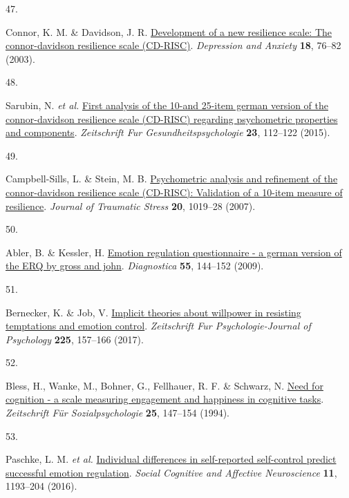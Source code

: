 \documentclass[
  man,floatsintext]{apa6}
\newlength{\cslhangindent}
\newlength{\csllabelwidth}
\newlength{\cslentryspacingunit} %
\newenvironment{CSLReferences}[2] %
 {%
  \setlength{\parindent}{0pt}
  \ifodd #1
  \let\oldpar\par
  \def\par{\hangindent=\cslhangindent\oldpar}
  \fi
  \setlength{\parskip}{#2\cslentryspacingunit}
 }%
 {}
\newcommand{\CSLLeftMargin}[1]{\parbox[t]{\csllabelwidth}{#1}}
\newcommand{\CSLRightInline}[1]{\parbox[t]{\linewidth - \csllabelwidth}{#1}\break}
\begin{document}
\begin{CSLReferences}{0}{0}
\leavevmode{}%
\CSLLeftMargin{47. }%
\CSLRightInline{Connor, K. M. \& Davidson, J. R. \href{https://doi.org/10.1002/da.10113}{Development of a new resilience scale: The connor-davidson resilience scale (CD-RISC)}. \emph{Depression and Anxiety} \textbf{18}, 76--82 (2003).}

\leavevmode{}%
\CSLLeftMargin{48. }%
\CSLRightInline{Sarubin, N. \emph{et al.} \href{https://doi.org/10.1026/0943-8149/a000142}{First analysis of the 10-and 25-item german version of the connor-davidson resilience scale (CD-RISC) regarding psychometric properties and components}. \emph{Zeitschrift Fur Gesundheitspsychologie} \textbf{23}, 112--122 (2015).}

\leavevmode{}%
\CSLLeftMargin{49. }%
\CSLRightInline{Campbell-Sills, L. \& Stein, M. B. \href{https://doi.org/10.1002/jts.20271}{Psychometric analysis and refinement of the connor-davidson resilience scale (CD-RISC): Validation of a 10-item measure of resilience}. \emph{Journal of Traumatic Stress} \textbf{20}, 1019--28 (2007).}

\leavevmode{}%
\CSLLeftMargin{50. }%
\CSLRightInline{Abler, B. \& Kessler, H. \href{https://doi.org/10.1026/0012-1924.55.3.144}{Emotion regulation questionnaire - a german version of the ERQ by gross and john}. \emph{Diagnostica} \textbf{55}, 144--152 (2009).}

\leavevmode{}%
\CSLLeftMargin{51. }%
\CSLRightInline{Bernecker, K. \& Job, V. \href{https://doi.org/10.1027/2151-2604/a000292}{Implicit theories about willpower in resisting temptations and emotion control}. \emph{Zeitschrift Fur Psychologie-Journal of Psychology} \textbf{225}, 157--166 (2017).}

\leavevmode{}%
\CSLLeftMargin{52. }%
\CSLRightInline{Bless, H., Wanke, M., Bohner, G., Fellhauer, R. F. \& Schwarz, N. \href{\%3CGo\%20to\%20ISI\%3E://WOS:A1994NR83900004}{Need for cognition - a scale measuring engagement and happiness in cognitive tasks}. \emph{Zeitschrift Für Sozialpsychologie} \textbf{25}, 147--154 (1994).}

\leavevmode{}%
\CSLLeftMargin{53. }%
\CSLRightInline{Paschke, L. M. \emph{et al.} \href{https://doi.org/10.1093/scan/nsw036}{Individual differences in self-reported self-control predict successful emotion regulation}. \emph{Social Cognitive and Affective Neuroscience} \textbf{11}, 1193--204 (2016).}


\end{CSLReferences}
\end{document}
